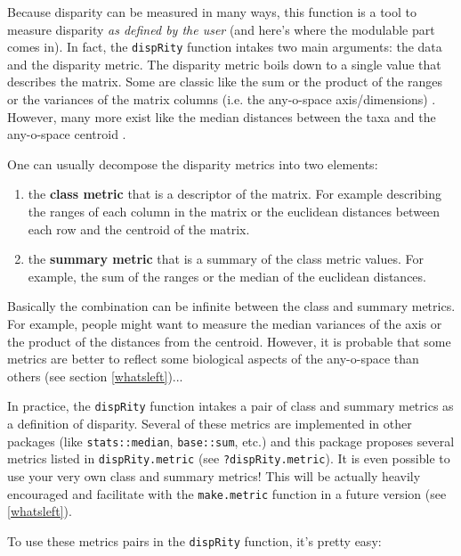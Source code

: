 \documentclass{article}\usepackage[]{graphicx}\usepackage[]{color}
\newcommand{\dispRity}{\texttt{dispRity} }
\begin{document}
Because disparity can be measured in many ways, this function is a tool to measure disparity \textit{as defined by the user} (and here's where the modulable part comes in).
In fact, the \dispRity function intakes two main arguments: the data and the disparity metric.
The disparity metric boils down to a single value that describes the matrix.
Some are classic like the sum or the product of the ranges or the variances of the matrix columns (i.e. the any-o-space axis/dimensions) \cite{Wills1994}.
However, many more exist like the median distances between the taxa and the any-o-space centroid \cite{GuillermeSTD}.

One can usually decompose the disparity metrics into two elements:
\begin{enumerate}
\item the \textbf{class metric} that is a descriptor of the matrix. For example describing the ranges of each column in the matrix or the euclidean distances between each row and the centroid of the matrix.
\item the \textbf{summary metric} that is a summary of the class metric values. For example, the sum of the ranges or the median of the euclidean distances. 
\end{enumerate}
Basically the combination can be infinite between the class and summary metrics.
For example, people might want to measure the median variances of the axis or the product of the distances from the centroid.
However, it is probable that some metrics are better to reflect some biological aspects of the any-o-space than others (see section \ref{whatsleft})...

In practice, the \dispRity function intakes a pair of class and summary metrics as a definition of disparity.
Several of these metrics are implemented in other packages (like \texttt{stats::median}, \texttt{base::sum}, etc.) and this package proposes several metrics listed in \texttt{dispRity.metric} (see \texttt{?dispRity.metric}).
It is even possible to use your very own class and summary metrics!
This will be actually heavily encouraged and facilitate with the \texttt{make.metric} function in a future version (see \ref{whatsleft}).

To use these metrics pairs in the \dispRity function, it's pretty easy:
\end{document}

